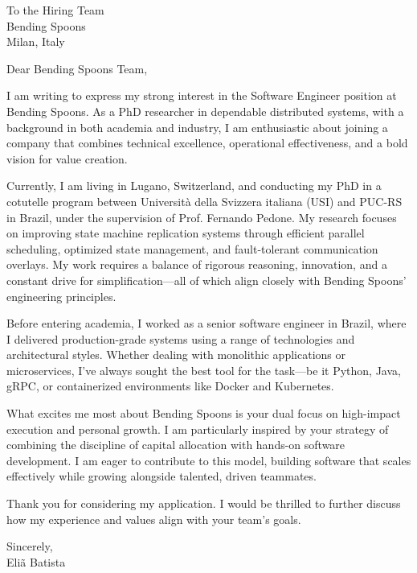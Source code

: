 \documentclass[a4paper,10pt]{letter}
\begin{document}
\begin{letter}{To the Hiring Team\\Bending Spoons\\Milan, Italy}
\opening{Dear Bending Spoons Team,}

I am writing to express my strong interest in the Software Engineer position at Bending Spoons. As a PhD researcher in dependable distributed systems, with a background in both academia and industry, I am enthusiastic about joining a company that combines technical excellence, operational effectiveness, and a bold vision for value creation.

Currently, I am living in Lugano, Switzerland, and conducting my PhD in a cotutelle program between Università della Svizzera italiana (USI) and PUC-RS in Brazil, under the supervision of Prof. Fernando Pedone. My research focuses on improving state machine replication systems through efficient parallel scheduling, optimized state management, and fault-tolerant communication overlays. My work requires a balance of rigorous reasoning, innovation, and a constant drive for simplification—all of which align closely with Bending Spoons’ engineering principles.

Before entering academia, I worked as a senior software engineer in Brazil, where I delivered production-grade systems using a range of technologies and architectural styles. Whether dealing with monolithic applications or microservices, I’ve always sought the best tool for the task—be it Python, Java, gRPC, or containerized environments like Docker and Kubernetes.

What excites me most about Bending Spoons is your dual focus on high-impact execution and personal growth. I am particularly inspired by your strategy of combining the discipline of capital allocation with hands-on software development. I am eager to contribute to this model, building software that scales effectively while growing alongside talented, driven teammates.

Thank you for considering my application. I would be thrilled to further discuss how my experience and values align with your team’s goals.

\closing{Sincerely,\\Eliã Batista}
\end{letter}
\end{document}
